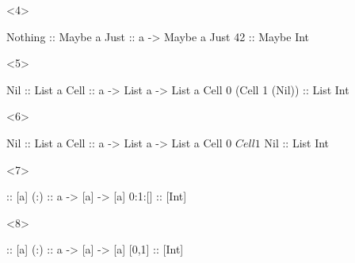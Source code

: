 \documentclass[17pt]{beamer}
\renewcommand{\(}[1]{\begin{columns}[#1]}
\renewcommand{\)}{\end{columns}}
\newcommand{\<}[1]{\begin{column}{#1}}
\renewcommand{\>}{\end{column}}
\begin{document}
\begin{frame}[fragile]
\begin{minipage}[t][.3\textheight]{\textwidth}
\begin{center}
\begin{onlyenv}
\end{onlyenv}
\begin{onlyenv}<4>
\begin{code}
                   Nothing ::      Maybe a
                   Just    :: a -> Maybe a
                   Just 42 ::      Maybe Int
\end{code}
\end{onlyenv}
\begin{onlyenv}<5>
\begin{code}
                       Nil :: List a
                      Cell :: a -> List a -> List a
     Cell 0 (Cell 1 (Nil)) :: List Int
\end{code}
\end{onlyenv}
\begin{onlyenv}<6>
\begin{code}
                       Nil :: List a
                      Cell :: a -> List a -> List a
     Cell 0 $ Cell 1 $ Nil :: List Int
\end{code}
\end{onlyenv}
\begin{onlyenv}<7>
\begin{code}
                        [] :: [a]
                       (:) :: a -> [a] -> [a]
                    0:1:[] :: [Int]
\end{code}
\end{onlyenv}
\begin{onlyenv}<8>
\begin{code}
                        [] :: [a]
                       (:) :: a -> [a] -> [a]
                     [0,1] :: [Int]
\end{code}
\end{onlyenv}
\end{center}
\end{minipage}
\end{frame}
\end{document}
